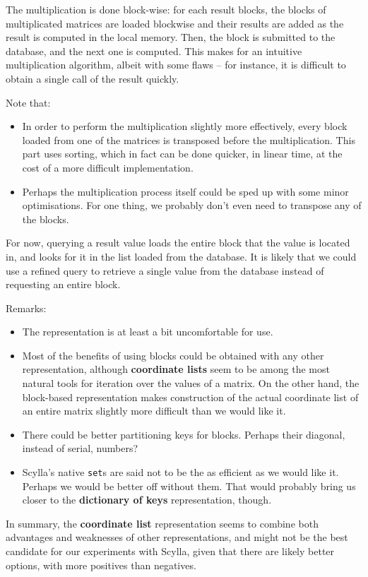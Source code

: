 \documentclass{article}
\newcommand{\code}[0]{\texttt}
\begin{document}
The multiplication is done block-wise: for each result blocks, the blocks of multiplicated matrices are loaded blockwise and their results are added as the result is computed in the local memory. Then, the block is submitted to the database, and the next one is computed. This makes for an intuitive multiplication algorithm, albeit with some flaws -- for instance, it is difficult to obtain a single call of the result quickly. 

Note that:
\begin{itemize}
\item In order to perform the multiplication slightly more effectively, every block loaded from one of the matrices is transposed before the multiplication. This part uses sorting, which in fact can be done quicker, in linear time, at the cost of a more difficult implementation.
\item Perhaps the multiplication process itself could be sped up with some minor optimisations. For one thing, we probably don't even need to transpose any of the blocks.
\end{itemize}

For now, querying a result value loads the entire block that the value is located in, and looks for it in the list loaded from the database. It is likely that we could use a refined query to retrieve a single value from the database instead of requesting an entire block. 

Remarks: 
\begin{itemize} 
\item The representation is at least a bit uncomfortable for use.
\item Most of the benefits of using blocks could be obtained with any other representation, although \textbf{coordinate lists} seem to be among the most natural tools for iteration over the values of a matrix. On the other hand, the block-based representation makes construction of the actual coordinate list of an entire matrix slightly more difficult than we would like it.
\item There could be better partitioning keys for blocks. Perhaps their diagonal, instead of serial, numbers?
\item Scylla's native \code{set}s are said not to be the as efficient as we would like it. Perhaps we would be better off without them. That would probably bring us closer to the \textbf{dictionary of keys} representation, though.
\end{itemize}

In summary, the \textbf{coordinate list} representation seems to combine both advantages and weaknesses of other representations, and might not be the best candidate for our experiments with Scylla, given that there are likely better options, with more positives than negatives. 
\end{document}
